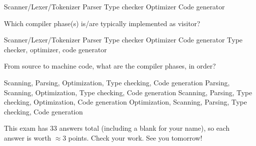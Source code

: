 \documentclass[addpoints,answers]{exam}
\begin{document}
\begin{questions}
\begin{oneparchoices}
\choice Scanner/Lexer/Tokenizer
\choice Parser
\choice Type checker
\choice Optimizer
\choice Code generator
\end{oneparchoices}

\answerline[A]

\question Which compiler phase(s) is/are typically implemented as visitor?

\begin{choices}
\choice Scanner/Lexer/Tokenizer
\choice Parser
\choice Type checker
\choice Optimizer
\choice Code generator
\choice Type checker, optimizer, code generator
\end{choices}

\answerline[F]

\question From source to machine code, what are the compiler phases, in order?

\begin{choices}
\choice Scanning, Parsing, Optimization,  Type checking, Code generation
\choice Parsing, Scanning, Optimization, Type checking, Code generation
\choice Scanning, Parsing, Type checking, Optimization, Code generation
\choice Optimization, Scanning, Parsing, Type checking, Code generation
\end{choices}

\answerline[C]

\end{questions}

This exam has 33 answers total (including a blank for your name), so each answer is worth $\approx 3$ points. Check your work. See you tomorrow!
\end{document}
